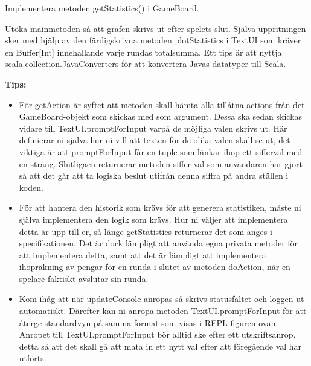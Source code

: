\Subtask Implementera metoden getStatistics() i GameBoard.

\Subtask Utöka mainmetoden så att grafen skrivs ut efter spelets slut. 
Själva uppritningen sker med hjälp av den färdigskrivna metoden plotStatistics i TextUI som kräver en Buffer[Int] innehållande varje rundas totalsumma. 
Ett tips är att nyttja scala.collection.JavaConverters för att konvertera Javas datatyper till Scala.

\textbf{Tips:}

\begin{itemize}
\item  För getAction är syftet att metoden skall hämta alla tillåtna actions från det GameBoard-objekt som skickas med som argument. Dessa ska sedan skickas vidare till TextUI.promptForInput varpå de möjliga valen skrivs ut. Här definierar ni själva hur ni vill att texten för de olika valen skall se ut, det viktiga är att promptForInput får en tuple som länkar ihop ett sifferval med en sträng. Slutligaen returnerar metoden siffer-val som användaren har gjort så att det går att ta logiska beslut utifrån denna siffra på andra ställen i koden.

\item  För att hantera den historik som krävs för att generera statistiken, måste ni själva implementera den logik som krävs. Hur ni väljer att implementera detta är upp till er, så länge getStatistics returnerar det som anges i specifikationen. Det är dock lämpligt att använda egna privata metoder för att implementera detta, samt att det är lämpligt att implementera ihopräkning av pengar för en runda i slutet av metoden doAction, när en spelare faktiskt avslutar sin runda.
\item Kom ihåg att när updateConsole anropas så skrivs statusfältet och loggen ut automatiskt. Därefter kan ni anropa metoden TextUI.promptForInput för att återge standardvyn på samma format som visas i REPL-figuren ovan. 
Anropet till TextUI.promptForInput bör alltid ske efter ett utskriftsanrop, detta så att det skall gå att mata in ett nytt val efter att föregående val har utförts.

\end{itemize}

